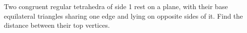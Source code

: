 Two congruent regular tetrahedra of side 1 rest on a plane, with their base equilateral triangles sharing one edge and lying on opposite sides of it. Find the distance between their top vertices.

